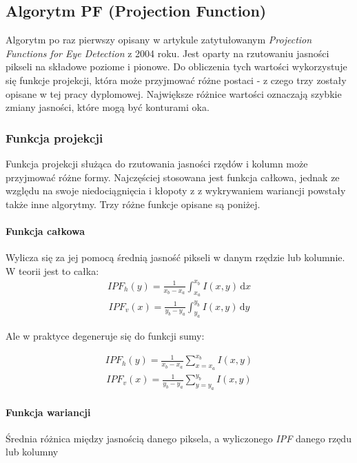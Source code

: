 \subsection{Algorytm PF (Projection Function)}

Algorytm po raz pierwszy opisany w artykule zatytułowanym \textit{Projection Functions for Eye Detection} \cite{projection_function} z 2004 roku. Jest oparty na rzutowaniu jasności pikseli na składowe poziome i pionowe. Do obliczenia tych wartości wykorzystuje się funkcje projekcji, która może przyjmować różne postaci - z czego trzy zostały opisane w tej pracy dyplomowej. Największe różnice wartości oznaczają szybkie zmiany jasności, które mogą być konturami oka. \cite{EyePupilWebCam}

\subsubsection{Funkcja projekcji}

Funkcja projekcji służąca do rzutowania jasności rzędów i kolumn może przyjmować różne formy. Najczęściej stosowana jest funkcja całkowa, jednak ze względu na swoje niedociągnięcia i kłopoty z z wykrywaniem wariancji powstały także inne algorytmy. Trzy różne funkcje opisane są poniżej.

\paragraph{Funkcja całkowa} Wylicza się za jej pomocą średnią jasność pikseli w danym rzędzie lub kolumnie. W teorii jest to całka:
\begin{align}
    {IPF_h}(y) = \frac{1}{{x_b}-{x_a}}\int_{x_a}^{x_b} I(x,y) \, \mathrm{d}x
\end{align}
\begin{align}
    {IPF_v}(x) = \frac{1}{{y_b}-{y_a}}\int_{y_a}^{y_b} I(x,y) \, \mathrm{d}y
\end{align}

Ale w praktyce degeneruje się do funkcji sumy:

\begin{align}
    {IPF_h}(y)=\frac{1}{{x_b}-{x_a}}\sum_{x={x_a}}^{{x_b}} I(x,y)
\end{align}
\begin{align}
    {IPF_v}(x)=\frac{1}{{y_b}-{y_a}}\sum_{y={y_a}}^{{y_b}} I(x,y)
\end{align}

\paragraph{Funkcja wariancji} Średnia różnica między jasnością danego piksela, a wyliczonego \textit{IPF} danego rzędu lub kolumny

